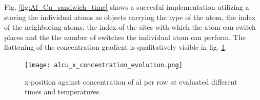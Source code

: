 Fig. \ref{fig:Al_Cu_sandwich_time} shows a succesful implementation utilizing a  storing the individual atoms as objects carrying the type of the atom, the index of the neighboring atoms, the index of the sites with which the atom can switch places and the the number of switches the individual atom can perform. The flattening of the concentration gradient is qualitatively visible in fig. \ref{fig:alcu_time_concentration_plot}.

\begin{figure}[htb]
	\centering
	\texttt{[image: alcu\_x\_concentration\_evolution.png]}
	\caption{x-position against concentration of al per row at evaluated different times and temperatures. }
	\label{fig:alcu_time_concentration_plot}
\end{figure}


\printbibliography


